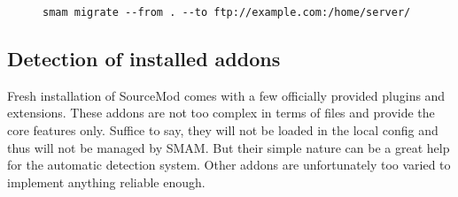 \begin{figure}[htp]
\centering
\verb|smam migrate --from . --to ftp://example.com:/home/server/|
\end{figure}

\subsection{Detection of installed addons}

Fresh installation of SourceMod comes with a few officially provided plugins and extensions.
These addons are not too complex in terms of files and provide the core features only.
Suffice to say, they will not be loaded in the local config and thus will not be managed by SMAM\@.
But their simple nature can be a great help for the automatic detection system.
Other addons are unfortunately too varied to implement anything reliable enough.
